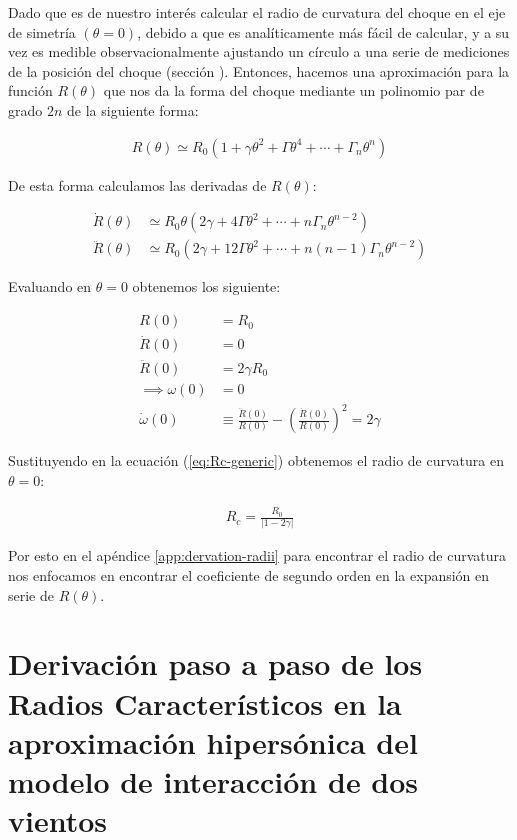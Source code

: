 Dado que es de nuestro interés calcular el radio de curvatura del choque en el eje de simetría
$(\theta=0)$, debido a que es analíticamente más fácil de calcular, y a su vez es medible
observacionalmente ajustando un círculo a una serie de mediciones de la posición del choque (sección ).
Entonces, hacemos una aproximación para la función $R(\theta)$ que nos da la forma del choque
mediante un polinomio par de grado $2n$ de la siguiente forma:

\begin{align}
R(\theta) \simeq R_0\left(1 + \gamma\theta^2 + \Gamma\theta^4 + \cdots + \Gamma_n\theta^n\right)
\end{align}

De esta forma calculamos las derivadas de $R(\theta)$:

\begin{align}
  \dot{R}(\theta) &\simeq R_0\theta\left(2\gamma + 4\Gamma\theta^2 + \cdots + n\Gamma_n\theta^{n-2}\right) \\
  \ddot{R}(\theta) &\simeq R_0\left(2\gamma + 12\Gamma\theta^2 + \cdots + n(n-1)\Gamma_n\theta^{n-2}\right)
\end{align}

Evaluando en $\theta = 0$ obtenemos los siguiente:

\begin{align}
  R(0) &= R_0 \\
  \dot{R}(0) &= 0 \\
  \ddot{R}(0) &= 2\gamma R_0 \\
  \implies \omega(0) &= 0 \\
  \dot{\omega}(0) &\equiv \frac{\ddot{R}(0)}{R(0)} - \left(\frac{\dot{R}(0)}{R(0)}\right)^2 = 2\gamma
\end{align}

Sustituyendo en la ecuación (\ref{eq:Rc-generic}) obtenemos el radio de curvatura en $\theta=0$:

\begin{align}
  R_c = \frac{R_0}{\left|1 - 2\gamma\right|}\label{eq:Rc-nose}
\end{align}

Por esto en el apéndice \ref{app:dervation-radii} para encontrar el radio de curvatura nos enfocamos en encontrar
el coeficiente de segundo orden en la expansión en serie de $R(\theta)$.

\chapter{Derivación paso a paso de los Radios Característicos en la aproximación
  hipersónica del modelo de interacción de dos vientos}
\label{app:derivation-radii}


